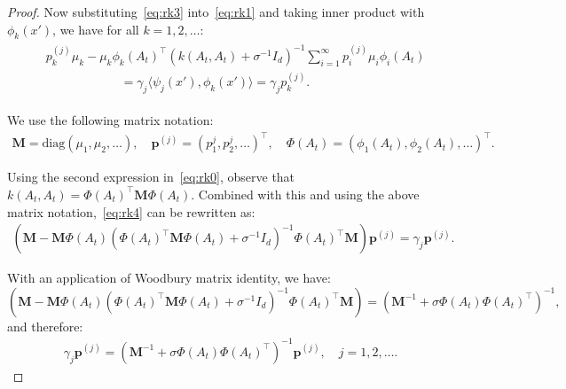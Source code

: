 \documentclass[final,12pt]{colt2026} %
\begin{document}
\begin{proof}
Now substituting~\eqref{eq:rk3} into~\eqref{eq:rk1} and taking inner product with $\phi_k(x')$, we have for all $k=1,2, \ldots$:
\begin{align}\label{eq:rk4}
\begin{split}
    &p^{(j)}_k \mu_k  - \mu_k \phi_k(A_t)^\top (k(A_t,A_t)+\sigma^{-1} I_d)^{-1} \sum_{i=1}^{\infty} p^{(j)}_i \mu_i \phi_i(A_t)\\
    &\qquad \qquad \qquad = \gamma_j \langle\psi_j(x'),\phi_k(x')\rangle = \gamma_j p^{(j)}_k.
\end{split}
\end{align}

We use the following matrix notation:
\begin{align}
\nonumber
    \mathbf{M}=\text{diag}(\mu_1,\mu_2,\ldots), \quad
        \mathbf{p}^{(j)}= (p^{j}_1,p^{j}_2,\ldots)^\top, \quad
    \Phi(A_t)= (\phi_1(A_t),\phi_2(A_t),\ldots)^\top.
\end{align}

Using the second expression in~\eqref{eq:rk0}, observe that $k(A_t,A_t)=  \Phi(A_t)^\top \mathbf{M} \Phi(A_t)$. Combined with this and using the above matrix notation,~\eqref{eq:rk4} can be rewritten as:
\begin{align}
    \left(\mathbf{M}  - \mathbf{M} \Phi(A_t)(\Phi(A_t)^\top \mathbf{M} \Phi(A_t)+\sigma^{-1} I_d)^{-1}\Phi(A_t)^\top \mathbf{M} \right) \mathbf{p}^{(j)} = \gamma_j \mathbf{p}^{(j)}.
\end{align}

With an application of Woodbury matrix identity, we have: 
$$\left(\mathbf{M}  - \mathbf{M} \Phi(A_t)(\Phi(A_t)^\top \mathbf{M} \Phi(A_t)+\sigma^{-1} I_d)^{-1}\Phi(A_t)^\top \mathbf{M} \right) = (\mathbf{M}^{-1} + \sigma \Phi(A_t)\Phi(A_t)^\top)^{-1},$$ 
and therefore:
\begin{align}
    \gamma_j \mathbf{p}^{(j)} = (\mathbf{M}^{-1} + \sigma \Phi(A_t)\Phi(A_t)^\top)^{-1} \mathbf{p}^{(j)}, \quad j=1,2,\ldots.
    \label{eq:rk5}
\end{align}


\end{proof}
\end{document}
